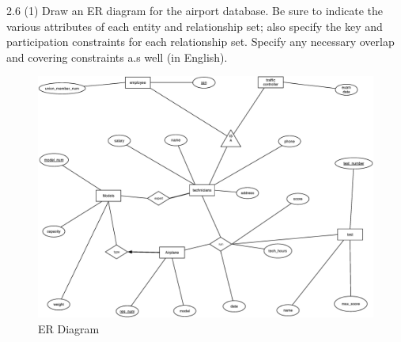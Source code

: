 \begin{problem}{2.6 (1)}
  \noindent Draw an ER diagram for the airport database. Be sure to indicate the various attributes of each entity and
  relationship set; also specify the key and participation constraints for each relationship set. Specify any necessary
  overlap and covering constraints a.s well (in English).

  \begin{solution}
    \begin{figure}[H]
      \centering
      \caption { ER Diagram }
      \includegraphics[scale=.4]{2_6.eps}
    \end{figure}
  \end{solution}
\end{problem}
\begin{problem}{2.8}
  \begin{solution}
  \end{solution}
\end{problem}



